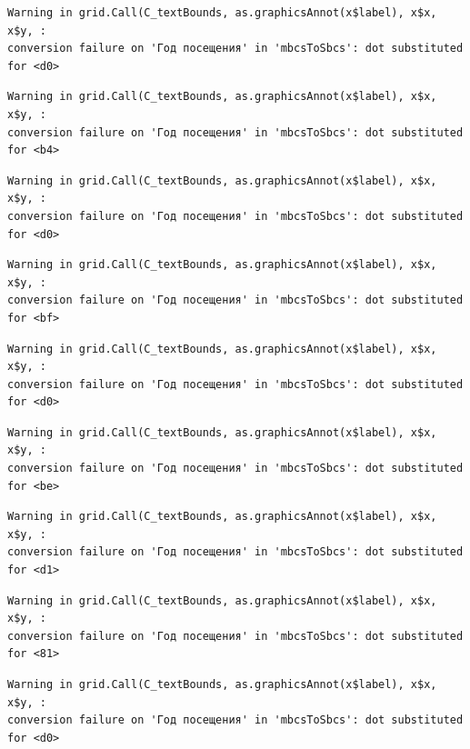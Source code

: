 \documentclass[
  letterpaper,
  DIV=11,
  numbers=noendperiod]{scrartcl}
\begin{document}
\begin{verbatim}
Warning in grid.Call(C_textBounds, as.graphicsAnnot(x$label), x$x, x$y, :
conversion failure on 'Год посещения' in 'mbcsToSbcs': dot substituted for <d0>
\end{verbatim}

\begin{verbatim}
Warning in grid.Call(C_textBounds, as.graphicsAnnot(x$label), x$x, x$y, :
conversion failure on 'Год посещения' in 'mbcsToSbcs': dot substituted for <b4>
\end{verbatim}

\begin{verbatim}
Warning in grid.Call(C_textBounds, as.graphicsAnnot(x$label), x$x, x$y, :
conversion failure on 'Год посещения' in 'mbcsToSbcs': dot substituted for <d0>
\end{verbatim}

\begin{verbatim}
Warning in grid.Call(C_textBounds, as.graphicsAnnot(x$label), x$x, x$y, :
conversion failure on 'Год посещения' in 'mbcsToSbcs': dot substituted for <bf>
\end{verbatim}

\begin{verbatim}
Warning in grid.Call(C_textBounds, as.graphicsAnnot(x$label), x$x, x$y, :
conversion failure on 'Год посещения' in 'mbcsToSbcs': dot substituted for <d0>
\end{verbatim}

\begin{verbatim}
Warning in grid.Call(C_textBounds, as.graphicsAnnot(x$label), x$x, x$y, :
conversion failure on 'Год посещения' in 'mbcsToSbcs': dot substituted for <be>
\end{verbatim}

\begin{verbatim}
Warning in grid.Call(C_textBounds, as.graphicsAnnot(x$label), x$x, x$y, :
conversion failure on 'Год посещения' in 'mbcsToSbcs': dot substituted for <d1>
\end{verbatim}

\begin{verbatim}
Warning in grid.Call(C_textBounds, as.graphicsAnnot(x$label), x$x, x$y, :
conversion failure on 'Год посещения' in 'mbcsToSbcs': dot substituted for <81>
\end{verbatim}

\begin{verbatim}
Warning in grid.Call(C_textBounds, as.graphicsAnnot(x$label), x$x, x$y, :
conversion failure on 'Год посещения' in 'mbcsToSbcs': dot substituted for <d0>
\end{verbatim}
\end{document}
